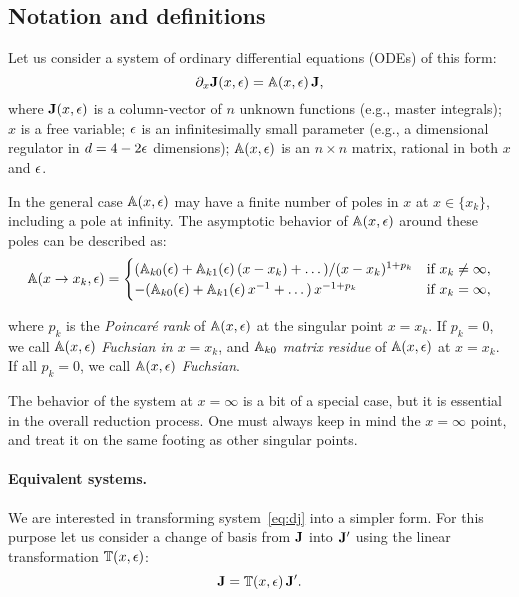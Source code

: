\documentclass[12pt,a4paper]{article}
\begin{document}
\subsection{Notation and definitions}

Let us consider a system of ordinary differential equations (ODEs) of this form:
\begin{equation}
\label{eq:dj}
    \partial_x \mathbf{J}(x,\epsilon) = \mathbb{A}(x,\epsilon)\,\mathbf{J},
\end{equation}
where $\mathbf{J}(x,\epsilon)$ is a column-vector of $n$ unknown functions (e.g., master integrals);
$x$ is a free variable;
$\epsilon$ is an infinitesimally small parameter (e.g., a dimensional regulator in $d=4-2\epsilon$ dimensions);
$\mathbb{A}(x,\epsilon)$ is an $n \times n$ matrix, rational in both $x$ and $\epsilon$.

In the general case $\mathbb{A}(x,\epsilon)$ may have a finite number of poles in $x$ at $x\in\{x_k\}$, including a pole at infinity.
The asymptotic behavior of $\mathbb{A}(x,\epsilon)$ around these poles can be described as:
\begin{equation}
\label{eq:axeps}
    \mathbb{A}(x \to x_k,\epsilon) =
    \begin{cases}
        (\mathbb{A}_{k0}(\epsilon) + \mathbb{A}_{k1}(\epsilon)\,(x - x_k) + \dots)/(x - x_k)^{1+p_k} & \text{if $x_k\neq\infty$}, \\
        -(\mathbb{A}_{k0}(\epsilon) + \mathbb{A}_{k1}(\epsilon)\,x^{-1} + \dots)\,x^{-1 + p_k} & \text{if $x_k=\infty$},
    \end{cases}
\end{equation}

where $p_k$ is the \textit{Poincar\'e rank} of $\mathbb{A}(x,\epsilon)$ at the singular point $x=x_k$.
If $p_k=0$, we call $\mathbb{A}(x,\epsilon)$ \textit{Fuchsian in $x=x_k$}, and $\mathbb{A}_{k0}$ \textit{matrix residue} of $\mathbb{A}(x,\epsilon)$ at $x=x_k$.
If all $p_k=0$, we call $\mathbb{A}(x,\epsilon)$ \textit{Fuchsian}.

The behavior of the system at $x=\infty$ is a bit of a special case, but it is essential in the overall reduction process.
One must always keep in mind the $x=\infty$ point, and treat it on the same footing as other singular points.

\paragraph{Equivalent systems.}
We are interested in transforming system~\eqref{eq:dj} into a simpler form.
For this purpose let us consider a change of basis from $\mathbf{J}$ into $\mathbf{J}'$ using the linear transformation $\mathbb{T}(x,\epsilon)$:
\begin{equation}
  \mathbf{J} = \mathbb{T}(x,\epsilon)\, \mathbf{J}'.
\end{equation}
\end{document}
